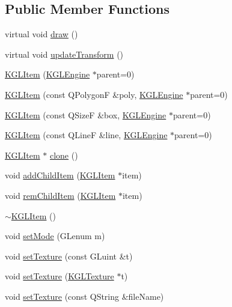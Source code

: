 \subsection*{Public Member Functions}
\begin{CompactItemize}
\item 
virtual void \hyperlink{class_k_g_l_item_4e4766cf0362fa050bffdf5f45d6d13f}{draw} ()
\item 
virtual void \hyperlink{class_k_g_l_item_3dbecc9db8e526a4c9623b35a004ed3c}{updateTransform} ()
\item 
\hyperlink{class_k_g_l_item_5ccd50011902e82584b676c5ffd6d5c0}{KGLItem} (\hyperlink{class_k_g_l_engine}{KGLEngine} $\ast$parent=0)
\item 
\hyperlink{class_k_g_l_item_0c2b3f2c4ee76fb09d58e95d75a0f12f}{KGLItem} (const QPolygonF \&poly, \hyperlink{class_k_g_l_engine}{KGLEngine} $\ast$parent=0)
\item 
\hyperlink{class_k_g_l_item_6a49457d29817772b0c05f471f3e8777}{KGLItem} (const QSizeF \&box, \hyperlink{class_k_g_l_engine}{KGLEngine} $\ast$parent=0)
\item 
\hyperlink{class_k_g_l_item_f1a9f58e453406da21e2db2e8a76bda1}{KGLItem} (const QLineF \&line, \hyperlink{class_k_g_l_engine}{KGLEngine} $\ast$parent=0)
\item 
\hyperlink{class_k_g_l_item}{KGLItem} $\ast$ \hyperlink{class_k_g_l_item_59c3205b918efb873fb011d4b676d2cd}{clone} ()
\item 
void \hyperlink{class_k_g_l_item_a667143176d94fd2366c64cd5d34b46e}{addChildItem} (\hyperlink{class_k_g_l_item}{KGLItem} $\ast$item)
\item 
void \hyperlink{class_k_g_l_item_42b7c5842dc8e7ee01c46b2a767e021a}{remChildItem} (\hyperlink{class_k_g_l_item}{KGLItem} $\ast$item)
\item 
\hyperlink{class_k_g_l_item_a303f5bf35c176400181aa59e3093ffa}{$\sim$KGLItem} ()
\item 
void \hyperlink{class_k_g_l_item_333a6829b561f2d9a5f904712aa3e3ed}{setMode} (GLenum m)
\item 
void \hyperlink{class_k_g_l_item_2ae8380935a0e01b35260dbb264270d5}{setTexture} (const GLuint \&t)
\item 
void \hyperlink{class_k_g_l_item_bf848a33d55dd5f96cd2399abe79411c}{setTexture} (\hyperlink{class_k_g_l_texture}{KGLTexture} $\ast$t)
\item 
void \hyperlink{class_k_g_l_item_73e87ddc6624de761a908880ab63bd77}{setTexture} (const QString \&fileName)
\item 

\end{CompactItemize}

